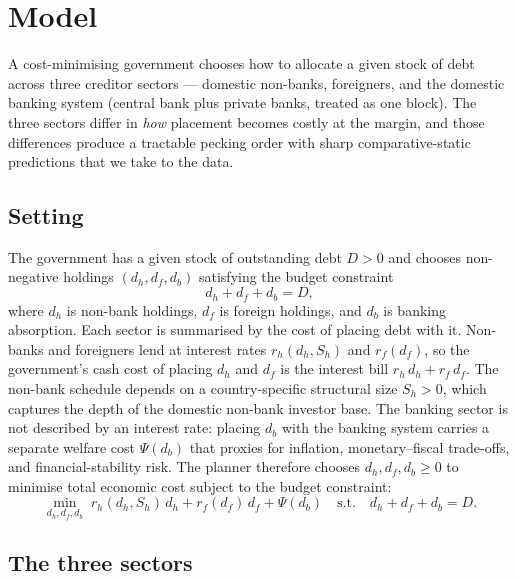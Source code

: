 \documentclass[\latexroot/\projectname]{subfiles}
\begin{document}
\section{Model}\whenintegrated{\label{sec:model}}

A cost-minimising government chooses how to allocate a given stock of
debt across three creditor sectors --- domestic non-banks, foreigners,
and the domestic banking system (central bank plus private banks,
treated as one block). The three sectors differ in \emph{how}
placement becomes costly at the margin, and those differences produce
a tractable pecking order with sharp comparative-static predictions
that we take to the data.

\subsection{Setting}

The government has a given stock of outstanding debt $D>0$ and chooses
non-negative holdings $(d_h,d_f,d_b)$ satisfying the budget constraint
\begin{equation}\label{eq:budget}
  d_h + d_f + d_b = D,
\end{equation}
where $d_h$ is non-bank holdings, $d_f$ is foreign holdings, and $d_b$
is banking absorption. Each sector is summarised by the cost of
placing debt with it. Non-banks and foreigners lend at interest rates
$r_h(d_h,S_h)$ and $r_f(d_f)$, so the government's cash cost of placing
$d_h$ and $d_f$ is the interest bill $r_h\,d_h + r_f\,d_f$. The
non-bank schedule depends on a country-specific structural size
$S_h>0$, which captures the depth of the domestic non-bank investor
base. The banking sector is not described by an interest rate:
placing $d_b$ with the banking system carries a separate welfare cost
$\Psi(d_b)$ that proxies for inflation, monetary--fiscal trade-offs,
and financial-stability risk. The planner therefore chooses
$d_h,d_f,d_b\ge 0$ to minimise total economic cost subject to the
budget constraint:
\begin{equation}\label{eq:planner}
  \min_{d_h,d_f,d_b}\;
    r_h(d_h,S_h)\,d_h + r_f(d_f)\,d_f + \Psi(d_b)
  \quad\text{s.t.}\quad d_h + d_f + d_b = D.
\end{equation}

\subsection{The three sectors}
\end{document}
